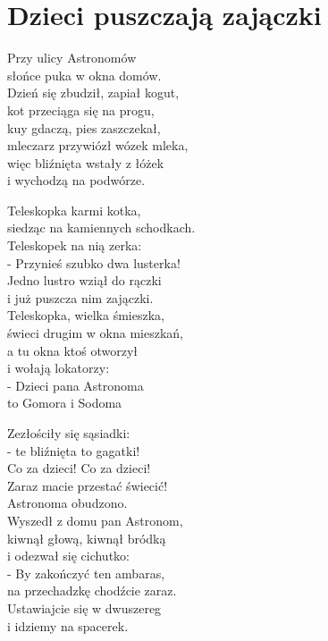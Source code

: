 \documentclass[11pt,a4pape,leqno,twoside]{book}
\begin{document}
\chapter{Dzieci puszczają zajączki}
Przy ulicy Astronomów\\
słońce puka w okna domów.\\
Dzień się zbudził, zapiał kogut,\\
kot przeciąga się na progu,\\
kuy gdaczą, pies zaszczekał,\\
mleczarz przywiózł wózek mleka,\\
więc bliźnięta wstały z łóżek\\
i wychodzą na podwórze.\\ \vspace{0.1cm}

Teleskopka karmi kotka,\\
siedząc na kamiennych schodkach.\\
Teleskopek na nią zerka:\\
- Przynieś szubko dwa lusterka!\\
Jedno lustro wziął do rączki\\
i już puszcza nim zajączki.\\
Teleskopka, wielka śmieszka,\\
świeci drugim w okna mieszkań,\\
a tu okna ktoś otworzył\\
i wołają lokatorzy:\\
- Dzieci pana Astronoma\\
to Gomora i Sodoma\\ \vspace{0.1cm}

Zezłościły się sąsiadki:\\
- te bliźnięta to gagatki!\\
Co za dzieci! Co za dzieci!\\
Zaraz macie przestać świecić!\\
Astronoma obudzono.\\
Wyszedł z domu pan Astronom,\\
kiwnął głową, kiwnął bródką\\
i odezwał się cichutko:\\
- By zakończyć ten ambaras,\\
na przechadzkę chodźcie zaraz.\\
Ustawiajcie się w dwuszereg\\
i idziemy na spacerek.

\end{document}
